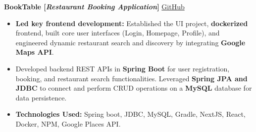\documentclass[10pt, letterpaper]{article}
\newenvironment{highlights}{
    \begin{itemize}[
        topsep=0.10 cm,     %
        parsep=0.10 cm,     %
        partopsep=0pt,      %
        itemsep=0.03cm,     %
        leftmargin=0 cm + 10pt  %
    ]
}{
    \end{itemize}
}
\begin{document}
        \vspace{0.2 cm}

        \noindent
        \textbf{BookTable [\textit{Restaurant Booking Application}]} \hfill \href{https://github.com/gopinathsjsu/team-project-20201-synergy}{\small GitHub}
        
        \begin{highlights}
            \item \textbf{Led key frontend development:} Established the UI project, \textbf{dockerized} frontend, built core user interfaces (Login, Homepage, Profile), and engineered dynamic restaurant search and discovery by integrating \textbf{Google Maps API}.
            \item Developed backend REST APIs in \textbf{Spring Boot} for user registration, booking, and restaurant search functionalities. Leveraged \textbf{Spring JPA and JDBC} to connect and perform CRUD operations on a \textbf{MySQL} database for data persistence.
            \item \textbf{Technologies Used:} Spring boot, JDBC, MySQL, Gradle, NextJS, React, Docker, NPM, Google Places API.
        \end{highlights}
\end{document}
